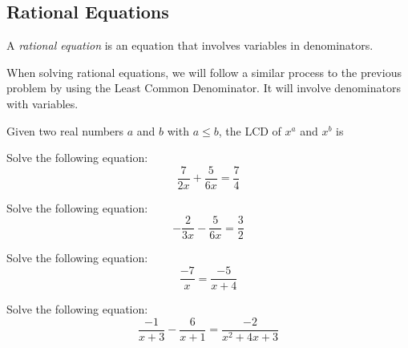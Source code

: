 \subsection{Rational Equations}

\begin{definition}
A \emph{rational equation} is an equation that involves variables in denominators.
\end{definition}

When solving rational equations, we will follow a similar process to the previous problem
by using the Least Common Denominator. It will involve denominators with variables.

\begin{fact}
Given two real numbers $a$ and $b$ with $a\leq b$, the LCD of $x^a$ and $x^b$
is 
\end{fact}

\begin{exercise}
Solve the following equation:
\[
\frac{7}{2x}+\frac{5}{6x}=\frac{7}{4}
\]
\end{exercise}
\begin{solution}[3in]

\end{solution}
\vspace{0.5em}

\begin{exercise}
Solve the following equation:
\[
-\frac{2}{3x}-\frac{5}{6x}=\frac{3}{2}
\]
\end{exercise}
\begin{solution}[3.5in]

\end{solution}
\vspace{0.5em}

\begin{exercise}
Solve the following equation:
\[
\frac{-7}{x}=\frac{-5}{x+4}
\]
\end{exercise}
\begin{solution}[3.5in]

\end{solution}
\vspace{0.5em}

\begin{exercise}
Solve the following equation:
\[
\frac{-1}{x+3}-\frac{6}{x+1}=\frac{-2}{x^2+4x+3}
\]
\end{exercise}
\begin{solution}[3.5in]

\end{solution}
\vspace{0.5em}

